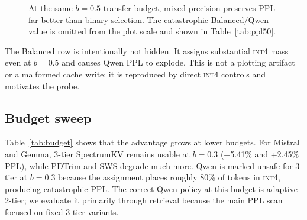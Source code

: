 \documentclass[11pt]{article}
\newcommand{\method}{SpectrumKV}
\newcommand{\budget}{b}
\newcommand{\pct}{\%}
\newcommand{\intiv}{\textsc{int4}}
\theoremstyle{plain}
\theoremstyle{definition}
\begin{document}
\begin{figure}[t]
\centering
{}
\caption{At the same $\budget=0.5$ transfer budget, mixed precision preserves PPL far better than binary selection.  The catastrophic Balanced/Qwen value is omitted from the plot scale and shown in Table~\ref{tab:ppl50}.}
\label{fig:ppl50}
\end{figure}

The Balanced row is intentionally not hidden.  It assigns substantial \intiv{} mass even at $\budget=0.5$ and causes Qwen PPL to explode.  This is not a plotting artifact or a malformed cache write; it is reproduced by direct \intiv{} controls and motivates the probe.

\subsection{Budget sweep}
\label{sec:rq8}

Table~\ref{tab:budget} shows that the advantage grows at lower budgets.  For Mistral and Gemma, 3-tier \method{} remains usable at $\budget=0.3$ (+5.41\pct{} and +2.45\pct{} PPL), while PDTrim and SWS degrade much more.  Qwen is marked unsafe for 3-tier at $\budget=0.3$ because the assignment places roughly 80\pct{} of tokens in \intiv{}, producing catastrophic PPL.  The correct Qwen policy at this budget is adaptive 2-tier; we evaluate it primarily through retrieval because the main PPL scan focused on fixed 3-tier variants.
\end{document}
